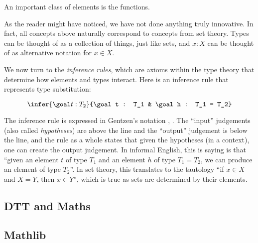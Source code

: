 An important class of elements is the functions. 

As the reader might have noticed, we have not done anything truly innovative. In fact, all concepts above naturally correspond to concepts from set theory. Types can be thought of as a collection of things, just like sets, and \(x : X\) can be thought of as alternative notation for \(x \in X\).

We now turn to the \textit{inference rules}, which are axioms within the type theory that determine how elements and types interact. Here is an inference rule that represents type substitution:

\[
  \infer{\goal t : T_2}{\goal t : T_1 & \goal h : T_1 = T_2}
\]

The inference rule is expressed in Gentzen's notation \cite{Gentzen1935a}, \cite{Gentzen1935b}. The ``input'' judgements (also called \textit{hypotheses}) are above the line and the ``output'' judgement is below the line, and the rule as a whole states that given the hypotheses (in a context), one can create the output judgement. In informal English, this is saying is that ``given an element \(t\) of type \(T_1\) and an element \(h\) of type \(T_1 = T_2\), we can produce an element of type \(T_2\)''. In set theory, this translates to the tautology ``if \(x \in X\) and \(X = Y\), then \(x \in Y\)'', which is true as sets are determined by their elements.

\subsection{DTT and Maths}

\subsection{Mathlib}


